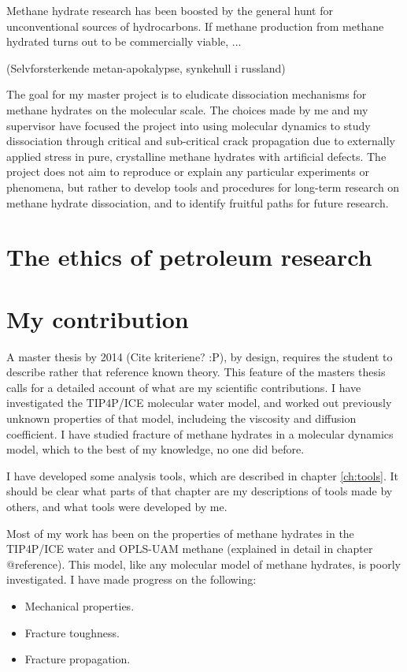 Methane hydrate research has been boosted by the general hunt for unconventional sources of hydrocarbons. If methane production from methane hydrated turns out to be commercially viable, ...

(Selvforsterkende metan-apokalypse, synkehull i russland)

The goal for my master project is to eludicate dissociation mechanisms for methane hydrates on the molecular scale. The choices made by me and my supervisor have focused the project into using molecular dynamics to study dissociation through critical and sub-critical crack propagation due to externally applied stress in pure, crystalline methane hydrates with artificial defects. The project does not aim to reproduce or explain any particular experiments or phenomena, but rather to develop tools and procedures for long-term research on methane hydrate dissociation, and to identify fruitful paths for future research.

\section{The ethics of petroleum research}

\section{My contribution}
A master thesis by 2014 (Cite kriteriene? :P), by design, requires the student to describe rather that reference known theory. This feature of the masters thesis calls for a detailed account of what are my scientific contributions. I have investigated the TIP4P/ICE molecular water model, and worked out previously unknown properties of that model, includeing the viscosity and diffusion coefficient. I have studied fracture of methane hydrates in a molecular dynamics model, which to the best of my knowledge, no one did before. 

I have developed some analysis tools, which are described in chapter \ref{ch:tools}. It should be clear what parts of that chapter are my descriptions of tools made by others, and what tools were developed by me.

Most of my work has been on the properties of methane hydrates in the  TIP4P/ICE water and OPLS-UAM methane (explained in detail in chapter @reference). This model, like any molecular model of methane hydrates, is poorly investigated. I have made progress on the following:
\begin{itemize}
\item Mechanical properties.
\item Fracture toughness.
\item Fracture propagation.
\end{itemize}


